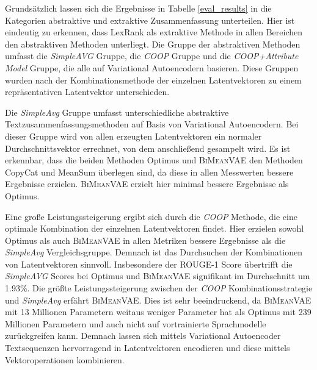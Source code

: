 Grundsätzlich lassen sich die Ergebnisse in Tabelle \ref{eval_results} in die Kategorien abstraktive und extraktive Zusammenfassung unterteilen.
Hier ist eindeutig zu erkennen, dass LexRank als extraktive Methode in allen Bereichen den abstraktiven Methoden unterliegt. 
Die Gruppe der abstraktiven Methoden umfasst die \textit{SimpleAVG} Gruppe, die \textit{COOP} Gruppe und die \textit{COOP+Attribute Model} Gruppe, die alle auf Variational Autoencodern basieren.
Diese Gruppen wurden nach der Kombinationsmethode der einzelnen Latentvektoren zu einem repräsentativen Latentvektor unterschieden.

Die \textit{SimpleAvg} Gruppe umfasst unterschiedliche abstraktive Textzusammenfassungsmethoden auf Basis von Variational Autoencodern.
Bei dieser Gruppe wird von allen erzeugten Latentvektoren ein normaler Durchschnittsvektor errechnet, von dem anschließend gesampelt wird.
Es ist erkennbar, dass die beiden Methoden Optimus und \textsc{BiMeanVAE} den Methoden CopyCat und MeanSum überlegen sind, da diese in allen Messwerten bessere Ergebnisse erzielen.
\textsc{BiMeanVAE} erzielt hier minimal bessere Ergebnisse als Optimus.


Eine große Leistungssteigerung ergibt sich durch die \textit{COOP} Methode, die eine optimale Kombination der einzelnen Latentvektoren findet.
Hier erzielen sowohl Optimus als auch \textsc{BiMeanVAE} in allen Metriken bessere Ergebnisse als die \textit{SimpleAvg} Vergleichsgruppe.
Demnach ist das Durchsuchen der Kombinationen von Latentvektoren sinnvoll. 
Insbesondere der ROUGE-1 Score übertrifft die \textit{SimpleAVG} Scores bei Optimus und \textsc{BiMeanVAE} signifikant im Durchschnitt um 1.93\%.  %
Die größte Leistungssteigerung zwischen der \textit{COOP} Kombinationsstrategie und \textit{SimpleAvg} erfährt \textsc{BiMeanVAE}.
Dies ist sehr beeindruckend, da \textsc{BiMeanVAE} mit 13 Millionen Parametern weitaus weniger Parameter hat als Optimus mit 239 Millionen Parametern und auch nicht auf vortrainierte Sprachmodelle zurückgreifen kann.
Demnach lassen sich mittels Variational Autoencoder Textsequenzen hervorragend in Latentvektoren encodieren und diese mittels Vektoroperationen kombinieren.

